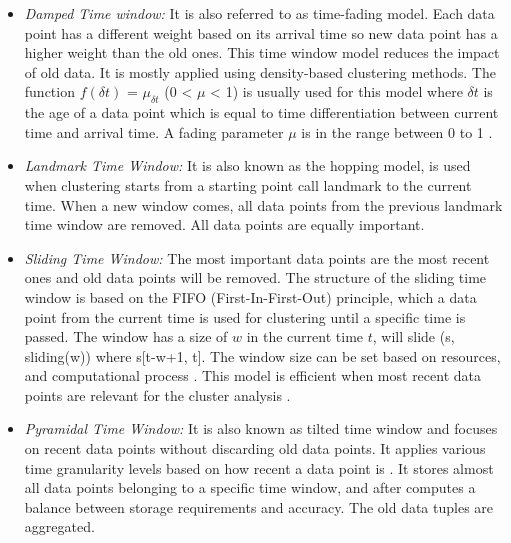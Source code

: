 \begin{itemize}

    \item\textit{Damped Time window:} It is also referred to as time-fading model. Each data point has a different weight based on its arrival time so new data point has a higher weight than the old ones. This time window model reduces the impact of old data. It is mostly applied using density-based clustering methods. The function $f(\delta t)$ = $\mu_{\delta t}$ (0 < $\mu$ < 1) is usually used for this model where $\delta t$ is the age of a data point which is equal to time differentiation between current time and arrival time. A fading parameter $\mu$ is in the range between 0 to 1 \cite{nguyen2015survey}. 
    
    
    \item\textit{Landmark Time Window:} It is also known as the hopping model, is used when clustering starts from a starting point call landmark to the current time. When a new window comes, all data points from the previous landmark time window are removed. All data points are equally important.

    \item\textit{Sliding Time Window: } The most important data points are the most recent ones and old data points will be removed. The structure of the sliding time window is based on the FIFO (First-In-First-Out) principle, which a data point from the current time is used for clustering until a specific time is passed. The window has a size of $w$ in the current time $t$, will slide (s, sliding(w)) where s[t-w+1, t].
    The window size can be set based on resources, and computational process \cite{silva2013data}. This model is efficient when most recent data points are relevant for the cluster analysis \cite{mansalis2018evaluation}.  
    
    \item\textit{Pyramidal Time Window: } It is also known as tilted time window and focuses on recent data points without discarding old data points. It applies various time granularity levels based on how recent a data point is \cite{aggarwal2003framework, nguyen2015survey}. It stores almost all data points belonging to a specific time window, and after computes a balance between storage requirements and accuracy. The old data tuples are aggregated. %
    
\end{itemize}    

